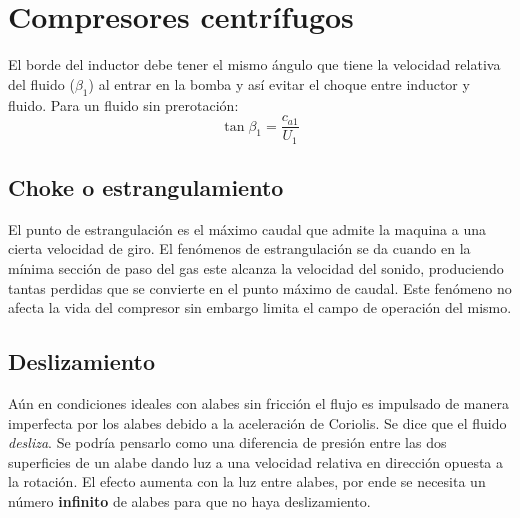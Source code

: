 \documentclass{article}
\newcommand{\cax}[1]{\ensuremath{c_{a #1}}}
\begin{document}
\section{Compresores centrífugos}


El borde del inductor debe tener el mismo ángulo que tiene la velocidad relativa del fluido ($\beta_1$) al entrar en la bomba y así evitar el choque entre inductor y fluido. Para un fluido sin prerotación:
\[
\tan \beta_1 = \frac{\cax{1}}{U_1}
\]

\subsection{Choke o estrangulamiento}
El punto de estrangulación es el máximo caudal que admite
la maquina a una cierta velocidad de giro.   
El fenómenos de estrangulación se da cuando en la mínima
sección de paso del gas este alcanza la velocidad del sonido,
produciendo tantas perdidas que se convierte en el punto
máximo de caudal.
Este fenómeno no afecta la vida del compresor sin embargo
limita el campo de operación del mismo.

\subsection{Deslizamiento}
Aún en condiciones ideales con alabes sin fricción el flujo es impulsado de manera imperfecta por los alabes debido a la aceleración de Coriolis. Se dice que el fluido \textit{desliza}. Se podría pensarlo como una diferencia de presión entre las dos superficies de un alabe dando luz a una velocidad relativa en dirección opuesta a la rotación. El efecto aumenta con la luz entre alabes, por ende se necesita un número \textbf{infinito} de alabes para que no haya deslizamiento.
\end{document}
